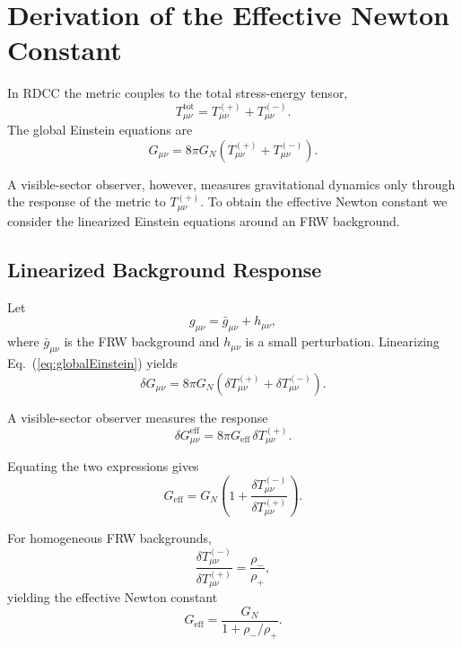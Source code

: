 \documentclass[11pt,a4paper]{article}
\begin{document}
\section{Derivation of the Effective Newton Constant}

In RDCC the metric couples to the total stress-energy tensor,
\begin{equation}
T_{\mu\nu}^{\mathrm{tot}} = T_{\mu\nu}^{(+)} + T_{\mu\nu}^{(-)}.
\end{equation}
The global Einstein equations are
\begin{equation}
G_{\mu\nu} = 8\pi G_N \left( T_{\mu\nu}^{(+)} + T_{\mu\nu}^{(-)} \right).
\label{eq:globalEinstein}
\end{equation}

A visible-sector observer, however, measures gravitational dynamics only through the response of the metric to $T_{\mu\nu}^{(+)}$. To obtain the effective Newton constant we consider the linearized Einstein equations around an FRW background.

\subsection{Linearized Background Response}

Let
\begin{equation}
g_{\mu\nu} = \bar{g}_{\mu\nu} + h_{\mu\nu},
\end{equation}
where $\bar{g}_{\mu\nu}$ is the FRW background and $h_{\mu\nu}$ is a small perturbation. Linearizing Eq.~(\ref{eq:globalEinstein}) yields
\begin{equation}
\delta G_{\mu\nu} = 8\pi G_N \left( \delta T_{\mu\nu}^{(+)} + \delta T_{\mu\nu}^{(-)} \right).
\end{equation}

A visible-sector observer measures the response
\begin{equation}
\delta G_{\mu\nu}^{\mathrm{eff}} = 8\pi G_{\mathrm{eff}} \, \delta T_{\mu\nu}^{(+)}.
\end{equation}

Equating the two expressions gives
\begin{equation}
G_{\mathrm{eff}} = G_N \left( 1 + \frac{\delta T_{\mu\nu}^{(-)}}{\delta T_{\mu\nu}^{(+)}} \right).
\end{equation}

For homogeneous FRW backgrounds,
\begin{equation}
\frac{\delta T_{\mu\nu}^{(-)}}{\delta T_{\mu\nu}^{(+)}} = \frac{\rho_-}{\rho_+},
\end{equation}
yielding the effective Newton constant
\begin{equation}
G_{\mathrm{eff}} = \frac{G_N}{1 + \rho_-/\rho_+}.
\label{eq:Geff}
\end{equation}
\end{document}

